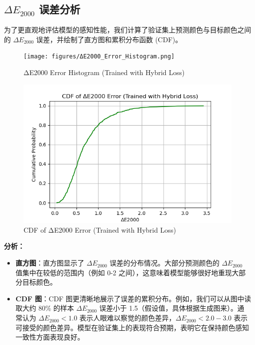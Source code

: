 \subsection[\hspace{-2pt}$\Delta E_{2000}$ 误差分析]{{\heiti{} \hspace{-8pt}$\Delta E_{2000}$ 误差分析}}\label{section2: Delta E 2000 误差分析}

为了更直观地评估模型的感知性能，我们计算了验证集上预测颜色与目标颜色之间的 $\Delta E_{2000}$ 误差，并绘制了直方图和累积分布函数 (CDF)。


\begin{figure}[h!]
\centering
{}
\texttt{[image: figures/ΔE2000\_Error\_Histogram.png]} %
\caption[ΔE2000 Error Histogram (Trained with Hybrid Loss)]{ΔE2000 Error Histogram (Trained with Hybrid Loss)}
\label{figure2: delta_e_histogram}
\end{figure}



\begin{figure}[h!]
\centering
{}
\includegraphics[width=0.8\columnwidth]{figures/CDF.png} %
\caption[CDF of ΔE2000 Error (Trained with Hybrid Loss)]{CDF of ΔE2000 Error (Trained with Hybrid Loss)}
\label{figure2: delta_e_cdf}
\end{figure}

\textbf{分析：}
\begin{itemize}
    \item \textbf{直方图}：直方图显示了 $\Delta E_{2000}$ 误差的分布情况。大部分预测颜色的 $\Delta E_{2000}$ 值集中在较低的范围内（例如 0-2 之间），这意味着模型能够很好地重现大部分目标颜色。
    \item \textbf{CDF 图}：CDF 图更清晰地展示了误差的累积分布。例如，我们可以从图中读取大约 80\% 的样本 $\Delta E_{2000}$ 误差小于 1.5（假设值，具体根据生成图来）。通常认为 $\Delta E_{2000} < 1.0$ 表示人眼难以察觉的颜色差异，$\Delta E_{2000} < 2.0-3.0$ 表示可接受的颜色差异。模型在验证集上的表现符合预期，表明它在保持颜色感知一致性方面表现良好。
\end{itemize}

